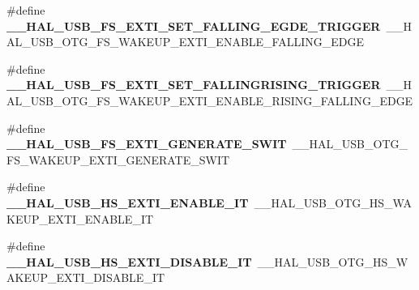 \begin{DoxyCompactItemize}
\item 
\#define {\bfseries \+\_\+\+\_\+\+H\+A\+L\+\_\+\+U\+S\+B\+\_\+\+F\+S\+\_\+\+E\+X\+T\+I\+\_\+\+S\+E\+T\+\_\+\+F\+A\+L\+L\+I\+N\+G\+\_\+\+E\+G\+D\+E\+\_\+\+T\+R\+I\+G\+G\+ER}~\+\_\+\+\_\+\+H\+A\+L\+\_\+\+U\+S\+B\+\_\+\+O\+T\+G\+\_\+\+F\+S\+\_\+\+W\+A\+K\+E\+U\+P\+\_\+\+E\+X\+T\+I\+\_\+\+E\+N\+A\+B\+L\+E\+\_\+\+F\+A\+L\+L\+I\+N\+G\+\_\+\+E\+D\+GE\hypertarget{group___h_a_l___u_s_b___aliased___macros_ga68573497dbc5121fc85cc2c1b5ef14e0}{}\label{group___h_a_l___u_s_b___aliased___macros_ga68573497dbc5121fc85cc2c1b5ef14e0}

\item 
\#define {\bfseries \+\_\+\+\_\+\+H\+A\+L\+\_\+\+U\+S\+B\+\_\+\+F\+S\+\_\+\+E\+X\+T\+I\+\_\+\+S\+E\+T\+\_\+\+F\+A\+L\+L\+I\+N\+G\+R\+I\+S\+I\+N\+G\+\_\+\+T\+R\+I\+G\+G\+ER}~\+\_\+\+\_\+\+H\+A\+L\+\_\+\+U\+S\+B\+\_\+\+O\+T\+G\+\_\+\+F\+S\+\_\+\+W\+A\+K\+E\+U\+P\+\_\+\+E\+X\+T\+I\+\_\+\+E\+N\+A\+B\+L\+E\+\_\+\+R\+I\+S\+I\+N\+G\+\_\+\+F\+A\+L\+L\+I\+N\+G\+\_\+\+E\+D\+GE\hypertarget{group___h_a_l___u_s_b___aliased___macros_ga9ea9069919f81db08800a1b92ee2c6ed}{}\label{group___h_a_l___u_s_b___aliased___macros_ga9ea9069919f81db08800a1b92ee2c6ed}

\item 
\#define {\bfseries \+\_\+\+\_\+\+H\+A\+L\+\_\+\+U\+S\+B\+\_\+\+F\+S\+\_\+\+E\+X\+T\+I\+\_\+\+G\+E\+N\+E\+R\+A\+T\+E\+\_\+\+S\+W\+IT}~\+\_\+\+\_\+\+H\+A\+L\+\_\+\+U\+S\+B\+\_\+\+O\+T\+G\+\_\+\+F\+S\+\_\+\+W\+A\+K\+E\+U\+P\+\_\+\+E\+X\+T\+I\+\_\+\+G\+E\+N\+E\+R\+A\+T\+E\+\_\+\+S\+W\+IT\hypertarget{group___h_a_l___u_s_b___aliased___macros_gacd4ec43a3a9636070ad5546851ea6623}{}\label{group___h_a_l___u_s_b___aliased___macros_gacd4ec43a3a9636070ad5546851ea6623}

\item 
\#define {\bfseries \+\_\+\+\_\+\+H\+A\+L\+\_\+\+U\+S\+B\+\_\+\+H\+S\+\_\+\+E\+X\+T\+I\+\_\+\+E\+N\+A\+B\+L\+E\+\_\+\+IT}~\+\_\+\+\_\+\+H\+A\+L\+\_\+\+U\+S\+B\+\_\+\+O\+T\+G\+\_\+\+H\+S\+\_\+\+W\+A\+K\+E\+U\+P\+\_\+\+E\+X\+T\+I\+\_\+\+E\+N\+A\+B\+L\+E\+\_\+\+IT\hypertarget{group___h_a_l___u_s_b___aliased___macros_ga57d438cdca8b644cd03124ffcb8ca763}{}\label{group___h_a_l___u_s_b___aliased___macros_ga57d438cdca8b644cd03124ffcb8ca763}

\item 
\#define {\bfseries \+\_\+\+\_\+\+H\+A\+L\+\_\+\+U\+S\+B\+\_\+\+H\+S\+\_\+\+E\+X\+T\+I\+\_\+\+D\+I\+S\+A\+B\+L\+E\+\_\+\+IT}~\+\_\+\+\_\+\+H\+A\+L\+\_\+\+U\+S\+B\+\_\+\+O\+T\+G\+\_\+\+H\+S\+\_\+\+W\+A\+K\+E\+U\+P\+\_\+\+E\+X\+T\+I\+\_\+\+D\+I\+S\+A\+B\+L\+E\+\_\+\+IT\hypertarget{group___h_a_l___u_s_b___aliased___macros_ga909208358d7e962ec3328278d80b0dfb}{}\label{group___h_a_l___u_s_b___aliased___macros_ga909208358d7e962ec3328278d80b0dfb}


\end{DoxyCompactItemize}
